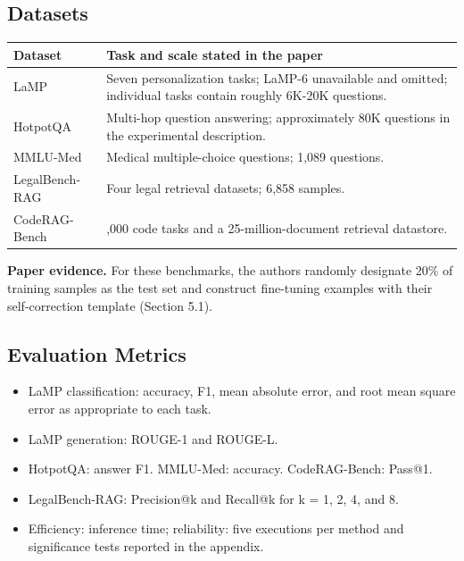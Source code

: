 \documentclass[11pt]{article}
\newcounter{none} %
\begin{document}
\subsection{Datasets}\label{datasets}

{\def\LTcaptype{none} %
\begin{longtable}[]{@{}
  >{\raggedright\arraybackslash}p{}
  >{\raggedright\arraybackslash}p{}@{}}
\toprule\noalign{}
\begin{minipage}[b]{\linewidth}\centering
\textbf{Dataset}
\end{minipage} & \begin{minipage}[b]{\linewidth}\centering
\textbf{Task and scale stated in the paper}
\end{minipage} \\
\midrule\noalign{}
\endhead
\bottomrule\noalign{}
\endlastfoot
LaMP & Seven personalization tasks; LaMP-6 unavailable and omitted;
individual tasks contain roughly 6K-20K questions. \\
HotpotQA & Multi-hop question answering; approximately 80K questions in
the experimental description. \\
MMLU-Med & Medical multiple-choice questions; 1,089 questions. \\
LegalBench-RAG & Four legal retrieval datasets; 6,858 samples. \\
CodeRAG-Bench & 9,000 code tasks and a 25-million-document retrieval
datastore. \\
\end{longtable}
}

\textbf{Paper evidence.} For these benchmarks, the authors randomly designate 20\% of
training samples as the test set and construct fine-tuning examples with
their self-correction template (Section 5.1).

\subsection{Evaluation Metrics}\label{evaluation-metrics}

\begin{itemize}
\item
  LaMP classification: accuracy, F1, mean absolute error, and root mean
  square error as appropriate to each task.
\item
  LaMP generation: ROUGE-1 and ROUGE-L.
\item
  HotpotQA: answer F1. MMLU-Med: accuracy. CodeRAG-Bench: Pass@1.
\item
  LegalBench-RAG: Precision@k and Recall@k for k = 1, 2, 4, and 8.
\item
  Efficiency: inference time; reliability: five executions per method
  and significance tests reported in the appendix.
\end{itemize}
\end{document}
